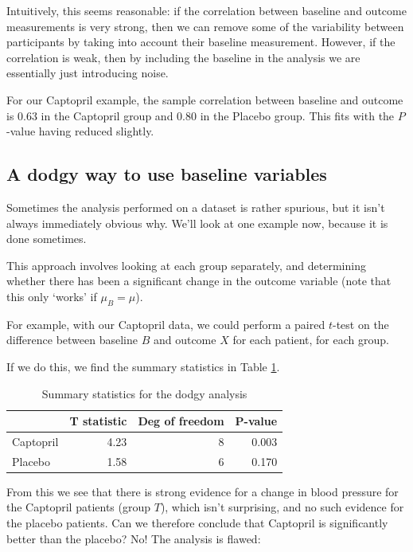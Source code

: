\documentclass[
  openany]{book}
\theoremstyle{definition}
\theoremstyle{definition}
\theoremstyle{definition}
\theoremstyle{definition}
\theoremstyle{remark}
\begin{document}
Intuitively, this seems reasonable: if the correlation between baseline and outcome measurements is very strong, then we can remove some of the variability between participants by taking into account their baseline measurement. However, if the correlation is weak, then by including the baseline in the analysis we are essentially just introducing noise.

For our Captopril example, the sample correlation between baseline and outcome is 0.63 in the Captopril group and 0.80 in the Placebo group. This fits with the \(P\)-value having reduced slightly.

\hypertarget{a-dodgy-way-to-use-baseline-variables}{%
\subsection{A dodgy way to use baseline variables}\label{a-dodgy-way-to-use-baseline-variables}}

Sometimes the analysis performed on a dataset is rather spurious, but it isn't always immediately obvious why. We'll look at one example now, because it is done sometimes.

This approach involves looking at each group separately, and determining whether there has been a significant change in the outcome variable (note that this only `works' if \(\mu_B = \mu\)).

For example, with our Captopril data, we could perform a paired \(t\)-test on the difference between baseline \(B\) and outcome \(X\) for each patient, for each group.

If we do this, we find the summary statistics in Table \ref{tab:ttestdodge}.

\begin{table}

\caption{\label{tab:ttestdodge}Summary statistics for the dodgy analysis}
\centering
\begin{tabular}[t]{l|r|r|r}
\hline
  & T statistic & Deg of freedom & P-value\\
\hline
Captopril & 4.23 & 8 & 0.003\\
\hline
Placebo & 1.58 & 6 & 0.170\\
\hline
\end{tabular}
\end{table}

From this we see that there is strong evidence for a change in blood pressure for the Captopril patients (group \(T\)), which isn't surprising, and no such evidence for the placebo patients. Can we therefore conclude that Captopril is significantly better than the placebo? No! The analysis is flawed:
\end{document}
